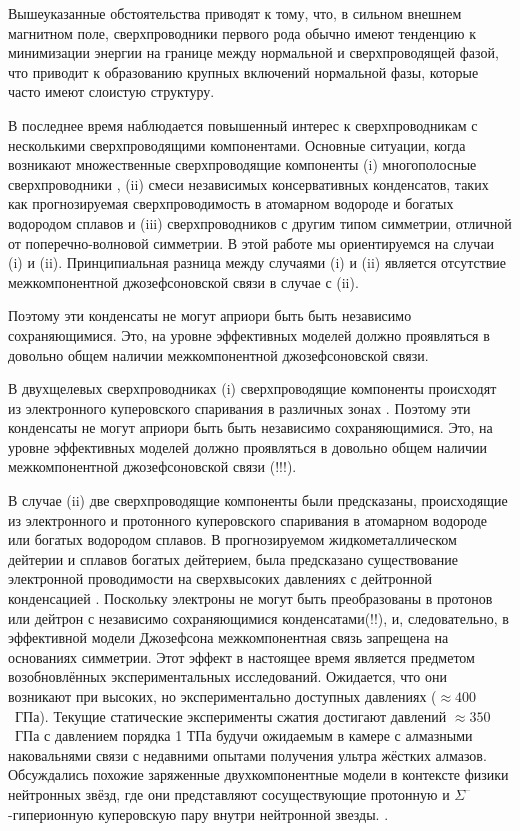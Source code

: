 Вышеуказанные обстоятельства приводят к тому, что, в сильном внешнем магнитном 
поле, сверхпроводники первого рода обычно имеют тенденцию к минимизации 
энергии на границе между нормальной и сверхпроводящей фазой, что приводит к 
образованию крупных включений нормальной фазы, которые часто имеют слоистую 
структуру\cite{bib:4}. 

В последнее время наблюдается повышенный интерес к сверхпроводникам с 
несколькими сверхпроводящими компонентами. Основные ситуации, когда возникают 
множественные сверхпроводящие компоненты (i) многополосные сверхпроводники
\cite{bib:6,bib:7,bib:8,bib:9,bib:10,bib:11}, (ii) смеси независимых 
консервативных конденсатов, таких как прогнозируемая сверхпроводимость в 
атомарном водороде и богатых водородом сплавов \cite{bib:12,bib:13,bib:14} и 
(iii) сверхпроводников с другим типом симметрии, отличной от 
поперечно-волновой симметрии. В этой работе мы ориентируемся на случаи (i) и 
(ii). Принципиальная разница между случаями (i) и (ii) является отсутствие 
межкомпонентной джозефсоновской связи в случае с (ii).

Поэтому эти конденсаты не могут априори быть быть независимо сохраняющимися.
Это, на уровне эффективных моделей должно проявляться в довольно общем наличии 
межкомпонентной джозефсоновской связи.

В двухщелевых сверхпроводниках (i) сверхпроводящие компоненты происходят из
электронного куперовского спаривания в различных зонах \cite{bib:6}. Поэтому 
эти конденсаты не могут априори быть быть независимо сохраняющимися. Это, на 
уровне эффективных моделей должно проявляться в довольно общем наличии 
межкомпонентной джозефсоновской связи (!!!).

В случае (ii) две сверхпроводящие компоненты были предсказаны, происходящие 
из электронного и протонного куперовского спаривания в атомарном водороде 
или богатых водородом сплавов. В прогнозируемом жидкометаллическом дейтерии и 
сплавов богатых дейтерием, была предсказано существование электронной 
проводимости на сверхвысоких давлениях с дейтронной конденсацией  
\cite{bib:12,bib:13,bib:14}. Поскольку электроны не могут быть преобразованы в 
протонов или дейтрон с независимо сохраняющимися конденсатами(!!), и, 
следовательно, в эффективной модели Джозефсона межкомпонентная связь запрещена 
на основаниях симметрии. Этот эффект в настоящее время является предметом 
возобновлённых экспериментальных исследований. Ожидается, что они возникают 
при высоких, но экспериментально доступных давлениях (\( \approx 400 \)~ГПа). 
Текущие статические эксперименты сжатия достигают давлений 
\( \approx 350 \)~ГПа с давлением порядка 1 ТПа будучи ожидаемым в камере с 
алмазными наковальнями связи с недавними опытами получения ультра жёстких 
алмазов. Обсуждались похожие заряженные двухкомпонентные модели в контексте 
физики нейтронных звёзд, где они представляют сосуществующие протонную и 
\( \Sigma^\text{--} \)-гиперионную куперовскую пару внутри нейтронной звезды.
\cite{bib:15}. 

